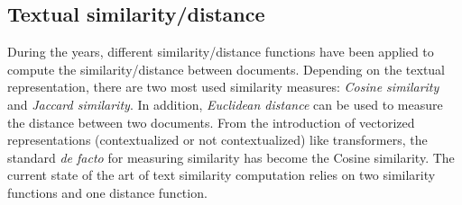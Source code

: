 \documentclass[\main/main.tex]{subfiles}
\begin{document}
\subsection{Textual similarity/distance}
During the years, different similarity/distance functions have been applied to compute the similarity/distance between documents. Depending on the textual representation, there are two most used similarity measures: \emph{Cosine similarity} and \emph{Jaccard similarity}. In addition, \emph{Euclidean distance} can be used to measure the distance between two documents. From the introduction of vectorized representations (contextualized or not contextualized) like transformers, the standard \emph{de facto} for measuring similarity has become the Cosine similarity.
The current state of the art of text similarity computation relies on two similarity functions and one distance function.
\end{document}
